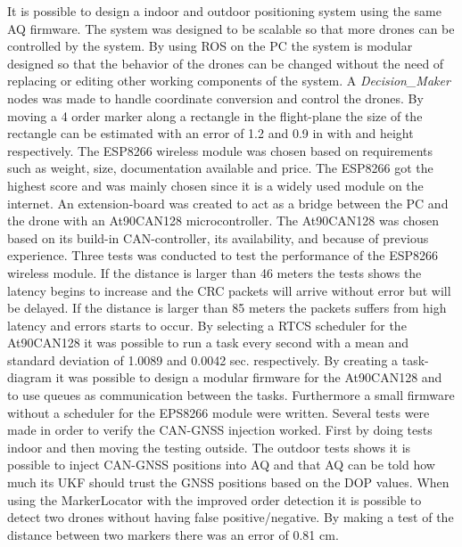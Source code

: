 It is possible to design a indoor and outdoor positioning system using the same \ac{AQ} firmware.
The system was designed to be scalable so that more drones can be controlled by the system.
By using ROS on the PC the system is modular designed so that the behavior of the drones can be changed without the need of replacing or editing other working components of the system. A \textit{Decision\_Maker} nodes was made to handle coordinate conversion and control the drones. By moving a 4 order marker along a rectangle in the flight-plane the size of the rectangle can be estimated with an error of 1.2 and 0.9 in with and height respectively. 
The ESP8266 wireless module was chosen based on requirements such as weight, size, documentation available and price. The ESP8266 got the highest score and was mainly chosen since it is a widely used module on the internet. An extension-board was created to act as a bridge between the PC and the drone with an At90CAN128 microcontroller. The At90CAN128 was chosen based on its build-in CAN-controller, its availability, and because of previous experience. Three tests was conducted to test the performance of the ESP8266 wireless module. If the distance is larger than 46 meters the tests shows the latency begins to increase and the CRC packets will arrive without error but will be delayed. If the distance is larger than 85 meters the packets suffers from high latency and errors starts to occur.
By selecting a \ac{RTCS} scheduler for the At90CAN128 it was possible to run a task every second with a mean and standard deviation of 1.0089 and 0.0042 sec. respectively. By creating a task-diagram it was possible to design a modular firmware for the At90CAN128 and to use queues as communication between the tasks. Furthermore a small firmware without a scheduler for the EPS8266 module were written.
Several tests were made in order to verify the CAN-GNSS injection worked. First by doing tests indoor and then moving the testing outside.
The outdoor tests shows it is possible to inject CAN-GNSS positions into \ac{AQ} and that \ac{AQ} can be told how much its UKF should trust the GNSS positions based on the DOP values.
When using the MarkerLocator with the improved order detection it is possible to detect two drones without having false positive/negative. By making a test of the distance between two markers there was an error of 0.81 cm.



